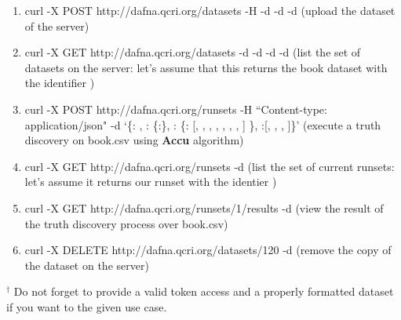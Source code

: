 \documentclass[a4paper,10pt]{scrartcl}
\begin{document}
\begin{enumerate}
 \item curl -X POST http://dafna.qcri.org/datasets -H   
  -d  -d  -d  (upload the dataset of the server)
 \item curl -X GET http://dafna.qcri.org/datasets -d  -d  -d  
 -d  (list the set of datasets on the server: let's assume that this returns the book dataset with the identifier \textbf{})
 \item curl -X POST http://dafna.qcri.org/runsets -H ``Content-type: application/json" -d `\{: , : \{:\}, : \{: [, , , , , , , ] \}, :[, , , ]\}' 
(execute a truth discovery on book.csv using \textbf{Accu} algorithm)
 \item  curl -X GET http://dafna.qcri.org/runsets -d  (list the set of current runsets: let's assume it returns our runset with the identier \textbf{})
\item curl -X GET http://dafna.qcri.org/runsets/1/results -d  (view the result of the truth discovery process over book.csv)
\item curl -X DELETE http://dafna.qcri.org/datasets/120 -d  (remove the copy of the dataset on the server)
 \end{enumerate}

$^{\dagger}$ Do not forget to provide a valid token access and a properly formatted dataset if you want to the given use case.
\end{document}
